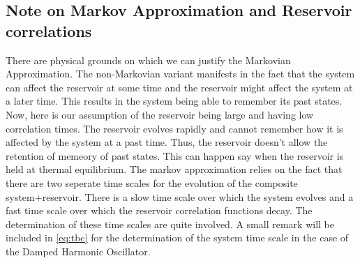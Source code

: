 \documentclass{scrartcl}
\newcommand{\1}{\mathbbm{1}}
\begin{document}
\subsection{Note on Markov Approximation and Reservoir correlations}
There are physical grounds on which we can justify the Markovian Approximation. The non-Markovian variant manifests in the
fact that the system can affect the reservoir at some time and the reservoir might affect the system at a later time. This
results in the system being able to remember its past states. Now, here is our assumption of the reservoir being large and having low
correlation times. The reservoir evolves rapidly and cannot remember how it is affected by the system at a past time. Thus,
the reservoir doesn't allow the retention of memeory of past states. This can happen say when the reservoir
is held at thermal equilibrium. The markov approximation relies on the fact that there are two seperate time scales for the evolution of the composite
system+reservoir. There is a slow time scale over which the system evolves and a fast time scale over which the reservoir correlation functions decay.
The determination of these time scales are quite involved. A small remark will be included in \cref{eq:tbc} for the determination of the system
time scale in the case of the Damped Harmonic Oscillator.
\end{document}
